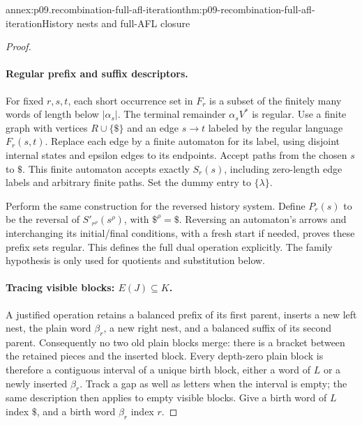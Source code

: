 \begin{annexitem}{annex:p09.recombination-full-afl-iteration}{thm:p09-recombination-full-afl-iteration}{History nests and full-AFL closure}
\begin{proof}
\paragraph{Regular prefix and suffix descriptors.}
For fixed \(r,s,t\), each short occurrence set in \(F_r\) is a subset of
the finitely many words of length below \(|\alpha_s|\).
The terminal remainder \(\alpha_sV^*\) is regular.
Use a finite graph with vertices \(R\cup\{\$\}\) and an edge \(s\to t\)
labeled by the regular language \(F_r(s,t)\).
Replace each edge by a finite automaton for its label, using disjoint
internal states and epsilon edges to its endpoints. Accept paths from
the chosen \(s\) to \(\$\). This finite automaton accepts exactly
\(S_r(s)\), including zero-length edge labels and arbitrary finite paths.
Set the dummy entry to \(\{\lambda\}\).

Perform the same construction for the reversed history system.
Define \(P_r(s)\) to be the reversal of
\(S'_{r^\rho}(s^\rho)\), with \(\$^\rho=\$\).
Reversing an automaton's arrows and interchanging its initial/final
conditions, with a fresh start if needed, proves these prefix sets regular.
This defines the full dual operation explicitly.
The family hypothesis is only used for quotients and substitution below.

\paragraph{Tracing visible blocks: \(E(J)\subseteq K\).}
A justified operation retains a balanced prefix of its first parent,
inserts a new left nest, the plain word \(\beta_r\), a new right nest,
and a balanced suffix of its second parent.
Consequently no two old plain blocks merge: there is a bracket between
the retained pieces and the inserted block. Every depth-zero plain block
is therefore a contiguous interval of a unique birth block, either a
word of \(L\) or a newly inserted \(\beta_r\). Track a gap as well as
letters when the interval is empty; the same description then applies
to empty visible blocks. Give a birth word of \(L\) index \(\$\),
and a birth word \(\beta_r\) index \(r\).


\end{proof}
\end{annexitem}
